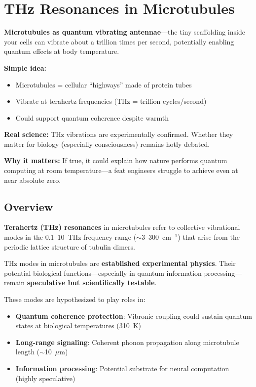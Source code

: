 \chapter{THz Resonances in Microtubules}
\label{ch:thz-resonances-microtubules}

\begin{nontechnical}
\textbf{Microtubules as quantum vibrating antennae}---the tiny scaffolding inside your cells can vibrate about a trillion times per second, potentially enabling quantum effects at body temperature.

\textbf{Simple idea:}
\begin{itemize}
\item Microtubules = cellular ``highways'' made of protein tubes
\item Vibrate at terahertz frequencies (THz = trillion cycles/second)
\item Could support quantum coherence despite warmth
\end{itemize}

\textbf{Real science:} THz vibrations are experimentally confirmed. Whether they matter for biology (especially consciousness) remains hotly debated.

\textbf{Why it matters:} If true, it could explain how nature performs quantum computing at room temperature---a feat engineers struggle to achieve even at near absolute zero.
\end{nontechnical}

\section{Overview}

\textbf{Terahertz (THz) resonances} in microtubules refer to collective vibrational modes in the 0.1--10~THz frequency range ($\sim$3--300~cm$^{-1}$) that arise from the periodic lattice structure of tubulin dimers.

\begin{keyconcept}
THz modes in microtubules are \textbf{established experimental physics}. Their potential biological functions---especially in quantum information processing---remain \textbf{speculative but scientifically testable}.
\end{keyconcept}

These modes are hypothesized to play roles in:
\begin{itemize}
\item \textbf{Quantum coherence protection}: Vibronic coupling could sustain quantum states at biological temperatures (310~K)
\item \textbf{Long-range signaling}: Coherent phonon propagation along microtubule length ($\sim$10~$\mu$m)
\item \textbf{Information processing}: Potential substrate for neural computation (highly speculative)
\end{itemize}



